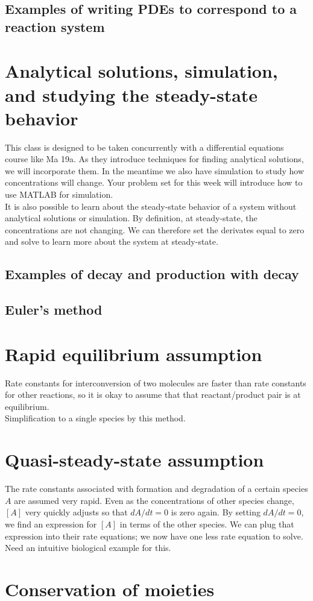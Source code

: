 \documentclass{article}
\begin{document}
\subsection*{Examples of writing PDEs to correspond to a reaction system}

\section*{Analytical solutions, simulation, and studying the steady-state behavior}

This class is designed to be taken concurrently with a differential equations course like Ma 19a. As they introduce techniques for finding analytical solutions, we will incorporate them. In the meantime we also have simulation to study how concentrations will change. Your problem set for this week will introduce how to use MATLAB for simulation. \\

It is also possible to learn about the steady-state behavior of a system without analytical solutions or simulation. By definition, at steady-state, the concentrations are not changing. We can therefore set the derivates equal to zero and solve to learn more about the system at steady-state.

\subsection*{Examples of decay and production with decay}

\subsection*{Euler's method}

\section*{Rapid equilibrium assumption}

Rate constants for interconversion of two molecules are faster than rate constants for other reactions, so it is okay to assume that that reactant/product pair is at equilibrium.\\

Simplification to a single species by this method.

\section*{Quasi-steady-state assumption}

The rate constants associated with formation and degradation of a certain species $A$ are assumed very rapid. Even as the concentrations of other species change, $[A]$ very quickly adjusts so that $dA/dt = 0$ is zero again. By setting $dA/dt = 0$, we find an expression for $[A]$ in terms of the other species. We can plug that expression into their rate equations; we now have one less rate equation to solve. Need an intuitive biological example for this.

\section*{Conservation of moieties}
\end{document}
